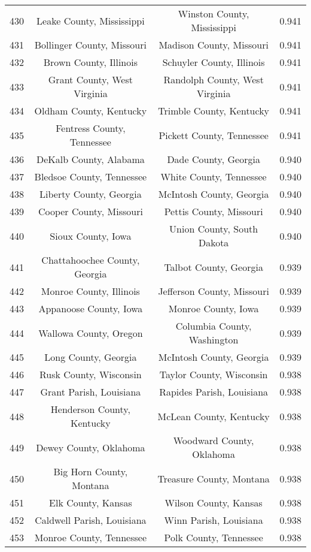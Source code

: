 \begin{longtable}{cccc}
  430 & Leake County, Mississippi & Winston County, Mississippi & 0.941 \\ 
  431 & Bollinger County, Missouri & Madison County, Missouri & 0.941 \\ 
  432 & Brown County, Illinois & Schuyler County, Illinois & 0.941 \\ 
  433 & Grant County, West Virginia & Randolph County, West Virginia & 0.941 \\ 
  434 & Oldham County, Kentucky & Trimble County, Kentucky & 0.941 \\ 
  435 & Fentress County, Tennessee & Pickett County, Tennessee & 0.941 \\ 
  436 & DeKalb County, Alabama & Dade County, Georgia & 0.940 \\ 
  437 & Bledsoe County, Tennessee & White County, Tennessee & 0.940 \\ 
  438 & Liberty County, Georgia & McIntosh County, Georgia & 0.940 \\ 
  439 & Cooper County, Missouri & Pettis County, Missouri & 0.940 \\ 
  440 & Sioux County, Iowa & Union County, South Dakota & 0.940 \\ 
  441 & Chattahoochee County, Georgia & Talbot County, Georgia & 0.939 \\ 
  442 & Monroe County, Illinois & Jefferson County, Missouri & 0.939 \\ 
  443 & Appanoose County, Iowa & Monroe County, Iowa & 0.939 \\ 
  444 & Wallowa County, Oregon & Columbia County, Washington & 0.939 \\ 
  445 & Long County, Georgia & McIntosh County, Georgia & 0.939 \\ 
  446 & Rusk County, Wisconsin & Taylor County, Wisconsin & 0.938 \\ 
  447 & Grant Parish, Louisiana & Rapides Parish, Louisiana & 0.938 \\ 
  448 & Henderson County, Kentucky & McLean County, Kentucky & 0.938 \\ 
  449 & Dewey County, Oklahoma & Woodward County, Oklahoma & 0.938 \\ 
  450 & Big Horn County, Montana & Treasure County, Montana & 0.938 \\ 
  451 & Elk County, Kansas & Wilson County, Kansas & 0.938 \\ 
  452 & Caldwell Parish, Louisiana & Winn Parish, Louisiana & 0.938 \\ 
  453 & Monroe County, Tennessee & Polk County, Tennessee & 0.938 \\ 

\end{longtable}
